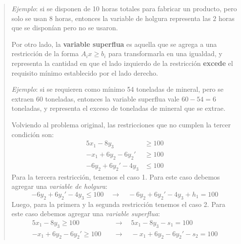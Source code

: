\begin{quote}
\begin{tcolorbox}[interesting_data, title=¿Qué significa variable de holgura?]
    \textit{Ejemplo}: si se disponen de 10 horas totales para fabricar un producto, pero solo se usan 8 horas, entonces la variable de holgura representa las \(2\) horas que se disponían pero no se usaron. 
  \end{tcolorbox}

  \begin{tcolorbox}[interesting_data, title=¿Qué significa variable superflua?]
    Por otro lado, la \textbf{variable superflua} es aquella que se agrega a una restricción de la forma \(A_i x \geq b_i\) para transformarla en una igualdad, y representa la cantidad en que el lado izquierdo de la restricción \textbf{excede} el requisito mínimo establecido por el lado derecho.

    \textit{Ejemplo}: si se requieren como mínimo 54 toneladas de mineral, pero se extraen 60 toneladas, entonces la variable superflua vale \(60 - 54 = 6\) toneladas, y representa el exceso de toneladas de mineral que se extrae. 
  \end{tcolorbox}

  \noindent Volviendo al problema original, las restricciones que no cumplen la tercer condición son:
  \begin{align*}
    5x_1 - 8y_3 &\geq 100 \\
    -x_1 + 6y_2 - 6y_2' &\geq 100 \\
    -6y_2 + 6y_2' - 4y_3 &\leq 100
  \end{align*}
  Para la tercera restricción, tenemos el caso 1. Para este caso debemos agregar una \textit{variable de holgura}:
  \[
    -6y_2 + 6y_2' - 4y_3 \leq 100 \quad \rightarrow \quad -6y_2 + 6y_2' - 4y_3 + h_1 = 100
  \]
  Luego, para la primera y la segunda restricción tenemos el caso 2. Para este caso debemos agregar una \textit{variable superflua}:
  \begin{align*}
    5x_1 - 8y_3 \geq 100 \quad &\rightarrow \quad 5x_1 - 8y_3 - s_1 = 100 \\
    -x_1 + 6y_2 - 6y_2' \geq 100 \quad &\rightarrow \quad -x_1 + 6y_2 - 6y_2' - s_2 = 100
  \end{align*}


\end{quote}

